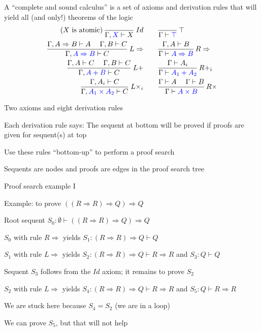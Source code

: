 A ``complete and sound calculus'' is a set of axioms and derivation
rules that will yield all (and only!) theorems of the logic
\begin{align*}
\text{(}X\text{ is atomic)\,}\frac{}{\Gamma,{\color{blue}X}\vdash X}\:Id & \qquad\frac{}{\Gamma\vdash{\color{blue}\top}}\,\top\\
\frac{\Gamma,A\Rightarrow B\vdash A\quad\;\Gamma,B\vdash C}{\Gamma,{\color{blue}A\Rightarrow B}\vdash C}\:L\Rightarrow & \qquad\frac{\Gamma,A\vdash B}{\Gamma\vdash{\color{blue}A\Rightarrow B}}\,R\Rightarrow\\
\frac{\Gamma,A\vdash C\quad\;\Gamma,B\vdash C}{\Gamma,{\color{blue}A+B}\vdash C}\:L+ & \qquad\frac{\Gamma\vdash A_{i}}{\Gamma\vdash{\color{blue}A_{1}+A_{2}}}\,R+_{i}\\
\frac{\Gamma,A_{i}\vdash C}{\Gamma,{\color{blue}A_{1}\times A_{2}}\vdash C}\:L\times_{i} & \qquad\frac{\Gamma\vdash A\quad\;\Gamma\vdash B}{\Gamma\vdash{\color{blue}A\times B}}\,R\times
\end{align*}

Two axioms and eight derivation rules

Each derivation rule says: The sequent at bottom will be proved if
proofs are given for sequent(s) at top

Use these rules ``bottom-up'' to perform a proof search

Sequents are nodes and proofs are edges in the proof search tree

Proof search example I

Example: to prove $\left(\left(R\Rightarrow R\right)\Rightarrow Q\right)\Rightarrow Q$

Root sequent $S_{0}:\emptyset\vdash\left(\left(R\Rightarrow R\right)\Rightarrow Q\right)\Rightarrow Q$

$S_{0}$ with rule $R\Rightarrow$ yields $S_{1}:\left(R\Rightarrow R\right)\Rightarrow Q\vdash Q$

$S_{1}$ with rule $L\Rightarrow$ yields $S_{2}:\left(R\Rightarrow R\right)\Rightarrow Q\vdash R\Rightarrow R$
and $S_{3}:Q\vdash Q$

Sequent $S_{3}$ follows from the $Id$ axiom; it remains to prove
$S_{2}$

$S_{2}$ with rule $L\Rightarrow$ yields $S_{4}:\left(R\Rightarrow R\right)\Rightarrow Q\vdash R\Rightarrow R$
and $S_{5}:Q\vdash R\Rightarrow R$

We are stuck here because $S_{4}=S_{2}$ (we are in a loop)

We can prove $S_{5}$, but that will not help

